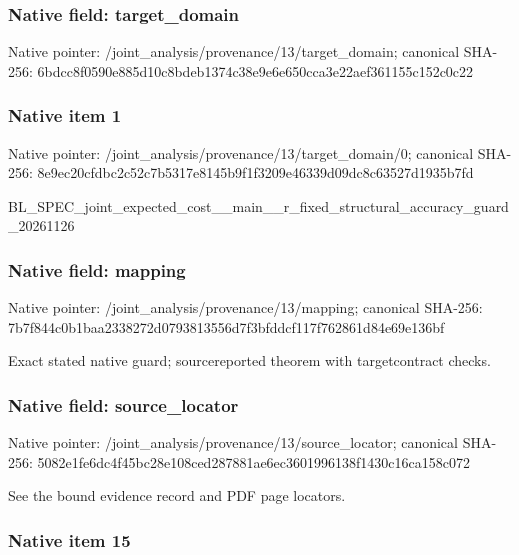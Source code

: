 \documentclass[10pt,a4paper]{article}
\begin{document}
\subsubsection{Native field: target\_domain}


Native pointer: /joint\_analysis/provenan\allowbreak{}ce/13/target\_domain; canonical SHA-256: 6bdcc8f0590e885d10c8bdeb\allowbreak{}1374c38e9e6e650cca3e22ae\allowbreak{}f361155c152c0c22



\subsubsection{Native item 1}


Native pointer: /joint\_analysis/provenan\allowbreak{}ce/13/target\_domain/0; canonical SHA-256: 8e9ec20cfdbc2c52c7b5317e\allowbreak{}8145b9f1f3209e46339d09dc\allowbreak{}8c63527d1935b7fd


BL\_SPEC\_joint\_expected\_c\allowbreak{}ost\_\_main\_\_r\_fixed\_struc\allowbreak{}tural\_accuracy\_guard\_202\allowbreak{}61126


\subsubsection{Native field: mapping}


Native pointer: /joint\_analysis/provenance/13/mapping; canonical SHA-256: 7b7f844c0b1baa2338272d07\allowbreak{}93813556d7f3bfddcf117f76\allowbreak{}2861d84e69e136bf


Exact stated native guard; sourcereported theorem with targetcontract checks.


\subsubsection{Native field: source\_locator}


Native pointer: /joint\_analysis/provenan\allowbreak{}ce/13/source\_locator; canonical SHA-256: 5082e1fe6dc4f45bc28e108c\allowbreak{}ed287881ae6ec3601996138f\allowbreak{}1430c16ca158c072


See the bound evidence record and PDF page locators.


\subsubsection{Native item 15}
\end{document}
